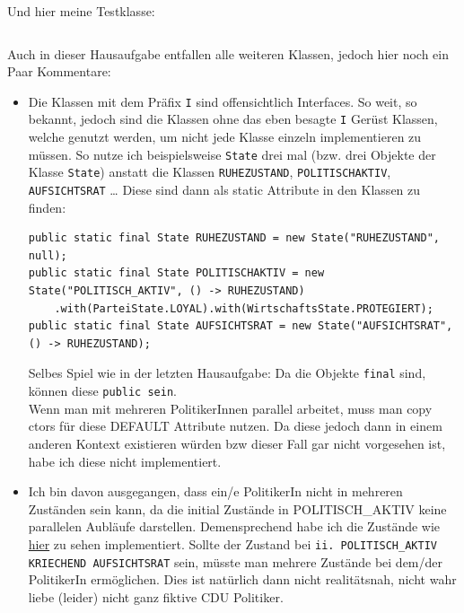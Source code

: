 \documentclass{article}
\begin{document}
\begin{enumerate}[label=\alph*.]
            \inputminted{java}{Steuerung.java}

            \newpage
            Und hier meine Testklasse:
            \inputminted{java}{Test.java}

            Auch in dieser Hausaufgabe entfallen alle weiteren Klassen, jedoch hier noch ein Paar Kommentare:

            \begin{itemize}
                \item Die Klassen mit dem Präfix \texttt{I} sind offensichtlich Interfaces.
                    So weit, so bekannt, jedoch sind die Klassen ohne das eben besagte \texttt{I} Gerüst Klassen, welche genutzt werden, um nicht jede Klasse einzeln implementieren zu müssen.
                    So nutze ich beispielsweise \texttt{State} drei mal (bzw. drei Objekte der Klasse \texttt{State}) anstatt die Klassen \texttt{RUHEZUSTAND}, \texttt{POLITISCHAKTIV}, \texttt{AUFSICHTSRAT} \ldots
                    Diese sind dann als static Attribute in den Klassen zu finden:

                    \begin{verbatim}
public static final State RUHEZUSTAND = new State("RUHEZUSTAND", null);
public static final State POLITISCHAKTIV = new State("POLITISCH_AKTIV", () -> RUHEZUSTAND)
    .with(ParteiState.LOYAL).with(WirtschaftsState.PROTEGIERT);
public static final State AUFSICHTSRAT = new State("AUFSICHTSRAT", () -> RUHEZUSTAND);
                    \end{verbatim}

                    Selbes Spiel wie in der letzten Hausaufgabe: Da die Objekte \texttt{final} sind, können diese \texttt{public sein}.\\
                    Wenn man mit mehreren PolitikerInnen parallel arbeitet, muss man copy ctors für diese DEFAULT Attribute nutzen.
                    Da diese jedoch dann in einem anderen Kontext existieren würden bzw dieser Fall gar nicht vorgesehen ist, habe ich diese nicht implementiert.

                \item Ich bin davon ausgegangen, dass ein/e PolitikerIn nicht in mehreren Zuständen sein kann, da die initial Zustände in POLITISCH\_AKTIV keine parallelen Aubläufe darstellen.
                    Demensprechend habe ich die Zustände wie \href{http://www.modeler.org.cn/tool/ToolsEA/UserGuide/model_simulation/multi-threading_-_concurrent_s.html}{hier} zu sehen implementiert.
                    Sollte der Zustand bei \texttt{ii. POLITISCH\_AKTIV KRIECHEND AUFSICHTSRAT} sein, müsste man mehrere Zustände bei dem/der PolitikerIn ermöglichen.
                    Dies ist natürlich dann nicht realitätsnah, nicht wahr liebe (leider) nicht ganz fiktive CDU Politiker.


\end{itemize}
\end{enumerate}
\end{document}

